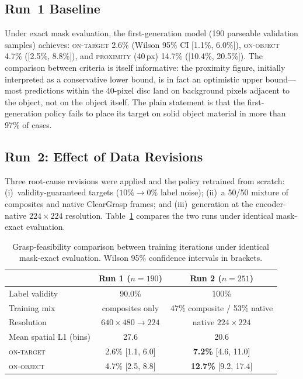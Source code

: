 \subsection{Run~1 Baseline}
\label{subsec:res_grasp_run1}
 
Under exact mask evaluation, the first-generation model (190 parseable
validation samples) achieves: \textsc{on-target} 2.6\% (Wilson 95\% CI
[1.1\%, 6.0\%]), \textsc{on-object} 4.7\% ([2.5\%, 8.8\%]), and
\textsc{proximity} (40\,px) 14.7\% ([10.4\%, 20.5\%]). The comparison
between criteria is itself informative: the proximity figure, initially
interpreted as a conservative lower bound, is in fact an optimistic upper
bound---most predictions within the 40-pixel disc land on background pixels
adjacent to the object, not on the object itself. The plain statement is that
the first-generation policy fails to place its target on solid object
material in more than 97\% of cases.
 
\subsection{Run~2: Effect of Data Revisions}
\label{subsec:res_grasp_run2}
 
Three root-cause revisions were applied and the policy retrained from
scratch: (i)~validity-guaranteed targets ($10\% \rightarrow 0\%$ label
noise); (ii)~a 50/50 mixture of composites and native ClearGrasp frames; and
(iii)~generation at the encoder-native $224 \times 224$ resolution.
Table~\ref{tab:run_comparison} compares the two runs under identical
mask-exact evaluation.
 
\begin{table}[htbp]
    \centering
    \caption{Grasp-feasibility comparison between training iterations under
    identical mask-exact evaluation. Wilson 95\% confidence intervals in
    brackets.}
    \label{tab:run_comparison}
    \begin{tabular}{lcc}
        \toprule
        & \textbf{Run 1} ($n = 190$) & \textbf{Run 2} ($n = 251$) \\
        \midrule
        Label validity & 90.0\% & 100\% \\
        Training mix & composites only & 47\% composite / 53\% native \\
        Resolution & $640{\times}480 \rightarrow 224$ & native $224{\times}224$ \\
        Mean spatial L1 (bins) & 27.6 & 20.6 \\
        \midrule
        \textsc{on-target} & 2.6\% [1.1, 6.0] & \textbf{7.2\%} [4.6, 11.0] \\
        \textsc{on-object} & 4.7\% [2.5, 8.8] & \textbf{12.7\%} [9.2, 17.4] \\
        \bottomrule
    \end{tabular}
\end{table}
 
